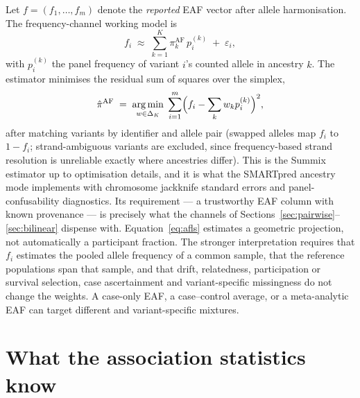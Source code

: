 \documentclass[11pt,a4paper]{article}
\newcommand{\simplex}{\Delta_{K}}
\DeclareMathOperator*{\argmin}{arg\,min}
\begin{document}
Let $f=(f_1,\ldots,f_m)$ denote the \emph{reported} EAF vector after allele
harmonisation. The frequency-channel working model is
\begin{equation}\label{eq:afmix}
  f_i \;\approx\; \sum_{k=1}^{K} \pi^{\mathrm{AF}}_k \, p^{(k)}_i
  \;+\; \varepsilon_i,
\end{equation}
with $p^{(k)}_i$ the panel frequency of variant $i$'s counted allele in
ancestry $k$. The estimator minimises the residual sum of squares over the
simplex,
\begin{equation}\label{eq:afls}
  \hat\pi^{\mathrm{AF}} \;=\;
  \argmin_{w \in \simplex}
  \; \sum_{i=1}^{m} \Bigl( f_i - \sum_k w_k p^{(k)}_i \Bigr)^{2},
\end{equation}
after matching variants by identifier and allele pair (swapped alleles map
$f_i$ to $1-f_i$; strand-ambiguous variants are excluded, since
frequency-based strand
resolution is unreliable exactly where ancestries differ). This is the
Summix estimator \citep{arriaga2021summix} up to optimisation details, and
it is what the SMARTpred ancestry mode implements with chromosome
jackknife standard errors and panel-confusability diagnostics. Its
requirement --- a trustworthy EAF column with known provenance --- is
precisely what the channels of Sections~\ref{sec:pairwise}--\ref{sec:bilinear}
dispense with. Equation~\eqref{eq:afls} estimates a geometric projection,
not automatically a participant fraction. The stronger interpretation
requires that $f_i$ estimates the pooled allele frequency of a common sample,
that the reference populations span that sample, and that drift, relatedness,
participation or survival selection, case ascertainment and variant-specific
missingness do not change the
weights. A case-only EAF, a case--control average, or a meta-analytic EAF can
target different and variant-specific mixtures.

\section{What the association statistics know}\label{sec:moments}
\end{document}
